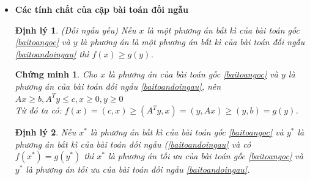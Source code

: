 \documentclass[12pt,a4paper]{report}
\newtheorem{dl}{Định lý}
\newtheorem{cm}{Chứng minh}
\begin{document}
\begin{itemize}
\begin{minipage}[t]{0.48\linewidth}
    Bài toán gốc
   \begin{equation}
       \begin{split}
           &{\rm{Min (Max)}} \langle c,x \rangle\\
          \rm{s.t} &\left\{\begin{split}
            & Ax= b\\
            & x \ge 0\\
           \end{split}\right.
       \end{split}
   \end{equation}
\end{minipage}\hfill
\begin{minipage}[t]{0.48\linewidth}
	Bài toán đối ngẫu
	\begin{equation}
		\begin{split}
			&{\rm{Max (Min)}} \langle b,y \rangle\\
		   \rm{s.t} & \left\{\begin{split}
				& A^Ty \le (\ge) c\\
				& y \hspace{0.1cm} \text{tự do}\\
			\end{split}\right.
		\end{split}
	\end{equation}
\end{minipage}
\item\textbf{Các tính chất của cặp bài toán đối ngẫu}
\begin{dl}\label{doingauyeu}
(Đối ngẫu yếu) Nếu $x$ là một phương án bất kì của bài toán gốc \eqref{baitoangoc} và $y$ là phương án là một phương án bất kì của bài toán đối ngẫu \eqref{baitoandoingau} thì $f(x)\ge g(y) $.
    \end{dl}
    \begin{cm}
        Cho $x$ là phương án của bài toán gốc \eqref{baitoangoc} và $y$ là phương án của bài toán đối ngẫu \eqref{baitoandoingau}, nên $Ax \ge b, A^Ty \le c, x\ge 0, y\ge 0$\\
        Từ đó ta có: $f(x)=(c,x)\ge (A^Ty,x)=(y,Ax) \ge(y,b)= g(y)$.\\
    \end{cm}
    \begin{dl}
        Nếu $x^*$ là phương án bất kì của bài toán gốc \eqref{baitoangoc} và $y^*$ là phương án bất kì của bài toán đối ngẫu (\eqref{baitoandoingau} và có $f(x^*)=g(y^*)$ thì $x^*$ là phương án tối ưu của bài toán gốc \eqref{baitoangoc} và $y^*$ là phương án tối ưu của bài toán đối ngẫu \eqref{baitoandoingau}.\\

\end{dl}
\end{itemize}
\end{document}
